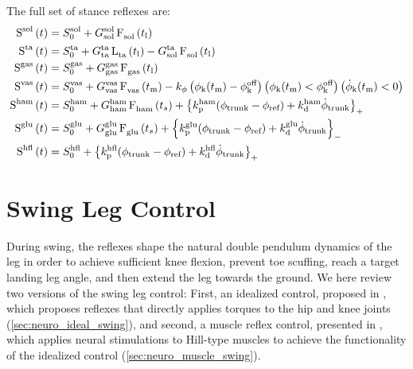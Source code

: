 \begin{fullwidth}
The full set of stance reflexes are:
\begin{align}    
    \func{S}[][\tn{sol}]{t} &= S_0^\tn{sol} + 
        G_\tn{sol}^\tn{sol} \func{F}[\tn{sol}][]{t_\tn{l}} \\
    \func{S}[][\tn{ta}]{t} &= S_0^\tn{ta} + 
        G_\tn{ta}^\tn{ta} \func{L}[\tn{ta}][]{t_\tn{l}} - G_\tn{sol}^\tn{ta} 
        \func{F}[\tn{sol}][]{t_\tn{l}}\\
    \func{S}[][\tn{gas}]{t} &= S_0^\tn{gas} + 
        G_\tn{gas}^\tn{gas} \func{F}[\tn{gas}][]{t_\tn{l}} \\
    \func{S}[][\tn{vas}]{t} &= S_0^\tn{vas} + 
        G_\tn{vas}^\tn{vas} \func{F}[\tn{vas}][]{t_\tn{m}} 
        -k_\phi \left( \phi_\tn{k}(t_\tn{m}) - \phi_\tn{k}^\tn{off} \right) 
        \left( \phi_\tn{k}(t_\tn{m}) < \phi_\tn{k}^\tn{off} \right)
        \left( \dot \phi_\tn{k}(t_\tn{m}) < 0\right) \\     
    \func{S}[][\tn{ham}]{t} &= S_0^\tn{ham} + 
        G_\tn{ham}^\tn{ham} \func{F}[\tn{ham}][]{t_{s}} 
        + \left\{ k_\tn{p}^\tn{ham} (\phi_{\tn{trunk}} - \phi_{\tn{ref}}) 
        + k_\tn{d}^\tn{ham} \dot{\phi}_{\tn{trunk}} \right\}_+ \\
    \func{S}[][\tn{glu}]{t} &= S_0^\tn{glu} + 
        G_\tn{glu}^\tn{glu} \func{F}[\tn{glu}][]{t_{s}}
        + \left\{ k_\tn{p}^\tn{glu} (\phi_{\tn{trunk}} - \phi_{\tn{ref}}) 
        + k_\tn{d}^\tn{glu} \dot{\phi}_{\tn{trunk}} \right\}_-  \\
    \func{S}[][\tn{hfl}]{t} &= S_0^\tn{hfl} + 
        \left\{ k_\tn{p}^\tn{hfl} (\phi_{\tn{trunk}} - \phi_{\tn{ref}}) 
        + k_\tn{d}^\tn{hfl} \dot{\phi}_{\tn{trunk}} \right\}_+ 
\end{align}    
\end{fullwidth}

\section{Swing Leg Control}\label{sec:neuro_swing_reflexes} During swing, the
reflexes shape the natural double pendulum dynamics of the leg in order to
achieve sufficient knee flexion, prevent toe scuffing, reach a target landing
leg angle, and then extend the leg towards the ground. We here review two
versions of the swing leg control: First, an idealized control, proposed in
\citet{desai2012robust}, which proposes reflexes that directly applies torques
to the hip and knee joints (\cref{sec:neuro_ideal_swing}), and second, a muscle
reflex control, presented in \citet{desai2013muscle}, which applies neural
stimulations to Hill-type muscles to achieve the functionality of the idealized
control (\cref{sec:neuro_muscle_swing}).

